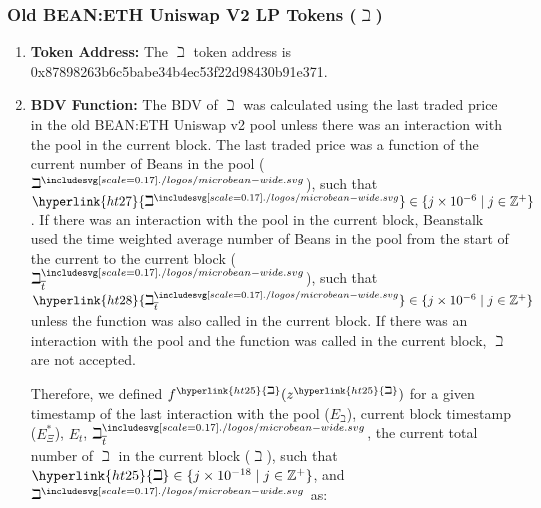 \documentclass[class=article, crop=false]{standalone}
\begin{document}
\vspace{-1.5mm}
\subsubsection{Old BEAN:ETH Uniswap V2 LP Tokens ($\beth$)}
\vspace*{-1.5mm}

\begin{enumerate}
    \item \textbf{Token Address:} The \hyperlink{ht25}{$\beth$} token address is 0x87898263b6c5babe34b4ec53f22d98430b91e371.
    
    \item \textbf{BDV Function:} The BDV of \hyperlink{ht25}{$\beth$} was calculated using the last traded price in the old BEAN:ETH Uniswap v2 pool unless there was an interaction with the pool in the current block. The last traded price was a function of the current number of Beans in the pool (\hyperlink{ht27}{$\beth^{\bean}$}), such that $\hyperlink{ht27}{\beth^{\bean}} \in \{j \times 10^{-6} \mid j \in \mathbb{Z}^{+} \}$. If there was an interaction with the pool in the current block, Beanstalk used the time weighted average number of Beans in the pool from the start of the current  to the current block (\hyperlink{ht28}{$\beth_{\overline{t}}^{\bean}$}), such that $\hyperlink{ht28}{\beth_{\overline{t}}^{\bean}} \in \{j \times 10^{-6} \mid j \in \mathbb{Z}^{+} \}$ unless the  function was also called in the current block. If there was an interaction with the pool and the  function was called in the current block, \hyperlink{ht25}{$\beth$}  are not accepted. 
        
        Therefore, we defined $f^{\hyperlink{ht25}{\beth}}(z^{\hyperlink{ht25}{\beth}})$ for a given timestamp of the last interaction with the pool (\hyperlink{ht72}{$E_{\beth}$}), current block timestamp (\hyperlink{ht73}{$E_{\Xi}^*$}), \hyperlink{ht74}{$E_t$}, \hyperlink{ht28}{$\beth_{\overline{t}}^{\bean}$}, the current total number of \hyperlink{ht25}{$\beth$} in the current block (\hyperlink{ht25}{$\beth$}), such that $\hyperlink{ht25}{\beth} \in \{j \times 10^{-18} \mid j \in \mathbb{Z}^{+} \}$, and \hyperlink{ht27}{$\beth^{\bean}$} as:
        

\end{enumerate}
\end{document}
